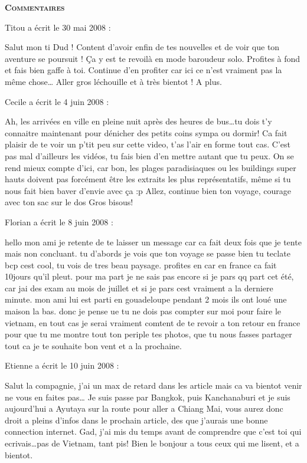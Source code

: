 \bigskip
\textbf{\textsc{Commentaires}}

\medskip
Titou a écrit le 30 mai 2008 :
\begin{displayquote}
Salut mon ti Dud !
Content d'avoir enfin de tes nouvelles et de voir que ton aventure se poursuit ! Ça y est te revoilà en mode baroudeur solo. Profites à fond et fais bien gaffe à toi.
Continue d'en profiter car ici ce n'est vraiment pas la même chose\dots
Aller gros léchouille et à très bientot !
A plus.
\end{displayquote}

\medskip
Cecile a écrit le 4 juin 2008 :
\begin{displayquote}
Ah, les arrivées en ville en pleine nuit après des heures de bus\dots tu dois t'y connaitre maintenant pour dénicher des petits coins sympa ou dormir!
Ca fait plaisir de te voir un p'tit peu sur cette video, t'as l'air en forme tout cas. C'est pas mal d'ailleurs les vidéos, tu fais bien d'en mettre autant que tu peux. On se rend mieux compte d'ici, car bon, les plages paradisiaques ou les buildings super hauts doivent pas forcément être les extraits les plus représentatifs, même si tu nous fait bien baver d'envie avec ça :p
Allez, continue bien ton voyage, courage avec ton sac sur le dos
Gros bisous!
\end{displayquote}

\medskip
Florian a écrit le 8 juin 2008 :
\begin{displayquote}
hello mon ami
je retente de te laisser un message car ca fait deux fois que je tente mais non concluant. tu d'abords je vois que ton voyage se passe bien tu teclate bcp cest cool, tu vois de tres beau paysage. profites en car en france ca fait 10jours qu'il pleut.
pour ma part je ne sais pas encore si je pars qq part cet été, car jai des exam au mois de juillet et si je pars cest vraiment a la derniere minute.
mon ami lui est parti en gouadeloupe pendant 2 mois ils ont loué une maison la bas.
donc je pense ue tu ne dois pas compter sur moi pour faire le vietnam, en tout cas je serai vraiment comtent de te revoir a ton retour en france pour que tu me montre tout ton periple tes photos, que tu nous fasses partager tout ca
je te souhaite bon vent et a la prochaine.
\end{displayquote}

\medskip
Etienne a écrit le 10 juin 2008 :
\begin{displayquote}
Salut la compagnie, j'ai un max de retard dans les article mais ca va bientot venir ne vous en faites pas\dots
Je suis passe par Bangkok, puis Kanchanaburi et je suis aujourd'hui a Ayutaya sur la route pour aller a Chiang Mai, vous aurez donc droit a pleins d'infos dans le prochain article, des que j'aurais une bonne connection internet.
Gad, j'ai mis du temps avant de comprendre que c'est toi qui ecrivais\dots pas de Vietnam, tant pis!
Bien le bonjour a tous ceux qui me lisent, et a bientot.
\end{displayquote}

